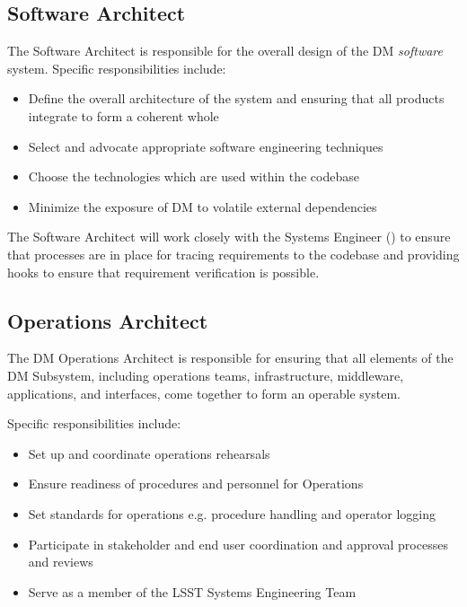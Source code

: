 \subsection{Software Architect \label{role:softarc}}

The Software Architect is responsible for the overall design of the DM \textit{software} system. Specific responsibilities include:

\begin{itemize}

\item{Define the overall architecture of the system and ensuring that all products integrate to form a coherent whole}
\item{Select and advocate appropriate software engineering techniques}
\item{Choose the technologies which are used within the codebase}
\item{Minimize the exposure of DM to volatile external dependencies}

\end{itemize}

The Software Architect will work closely with the Systems Engineer () to ensure that processes are in place for tracing requirements to the codebase and providing hooks to ensure that requirement verification is possible.

\subsection{Operations Architect \label{role:opsarc}}

The DM Operations Architect is responsible for ensuring that all elements of the DM Subsystem, including operations teams, infrastructure, middleware, applications, and interfaces,
come together to form an operable system.

Specific responsibilities include:

\begin{itemize}
\item Set up and coordinate operations rehearsals
\item Ensure readiness of procedures and personnel for Operations
\item Set standards for operations e.g. procedure handling and operator logging
\item Participate in stakeholder and end user coordination and approval processes and reviews
\item Serve as a member of the LSST Systems Engineering Team
\end{itemize}

